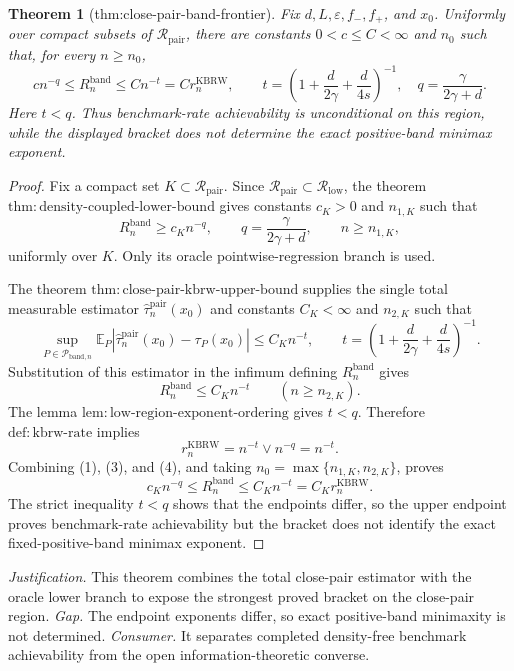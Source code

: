 \documentclass{article}
\newtheorem{theorem}{Theorem}
\begin{document}
\begin{theorem}[thm:close-pair-band-frontier]\label{thm:close-pair-band-frontier}
Fix \(d,L,\varepsilon,f_-,f_+\), and \(x_0\).  Uniformly over compact
subsets of \(\mathcal R_{\mathrm{pair}}\), there are constants
\(0<c\leq C<\infty\) and \(n_0\) such that, for every \(n\geq n_0\),
\[
c n^{-q}\leq R_n^{\mathrm{band}}
\leq C n^{-t}=C r_n^{\mathrm{KBRW}},
\qquad
t=\left(1+\frac d{2\gamma}+\frac d{4s}\right)^{-1},
\quad q=\frac\gamma{2\gamma+d}.
\]
Here \(t<q\).  Thus benchmark-rate achievability is unconditional on this
region, while the displayed bracket does not determine the exact positive-band
minimax exponent.
\end{theorem}
\begin{proof}
Fix a compact set \(K\subset\mathcal R_{\mathrm{pair}}\).  Since
\(\mathcal R_{\mathrm{pair}}\subset\mathcal R_{\mathrm{low}}\), the theorem
\(\mathrm{thm:density\mbox{-}coupled\mbox{-}lower\mbox{-}bound}\) gives
constants \(c_K>0\) and \(n_{1,K}\) such that
\[
R_n^{\mathrm{band}}\geq c_Kn^{-q},
\qquad
q=\frac{\gamma}{2\gamma+d},
\qquad n\geq n_{1,K},
\tag{1}
\]
uniformly over \(K\).  Only its oracle pointwise-regression branch is used.

The theorem
\(\mathrm{thm:close\mbox{-}pair\mbox{-}kbrw\mbox{-}upper\mbox{-}bound}\)
supplies the single total measurable estimator
\(\widehat\tau_n^{\mathrm{pair}}(x_0)\) and constants \(C_K<\infty\) and
\(n_{2,K}\) such that
\[
\sup_{P\in\mathcal P_{\mathrm{band},n}}
\mathbb E_P\left|
\widehat\tau_n^{\mathrm{pair}}(x_0)-\tau_P(x_0)
\right|
\leq C_Kn^{-t},
\qquad
t=\left(1+\frac d{2\gamma}+\frac d{4s}\right)^{-1}.
\tag{2}
\]
Substitution of this estimator in the infimum defining
\(R_n^{\mathrm{band}}\) gives
\[
R_n^{\mathrm{band}}\leq C_Kn^{-t}
\qquad(n\geq n_{2,K}).
\tag{3}
\]
The lemma
\(\mathrm{lem:low\mbox{-}region\mbox{-}exponent\mbox{-}ordering}\) gives
\(t<q\).  Therefore \(\mathrm{def:kbrw\mbox{-}rate}\) implies
\[
r_n^{\mathrm{KBRW}}=n^{-t}\vee n^{-q}=n^{-t}.
\tag{4}
\]
Combining (1), (3), and (4), and taking
\(n_0=\max\{n_{1,K},n_{2,K}\}\), proves
\[
c_Kn^{-q}\leq R_n^{\mathrm{band}}
\leq C_Kn^{-t}=C_Kr_n^{\mathrm{KBRW}}.
\]
The strict inequality \(t<q\) shows that the endpoints differ, so the upper
endpoint proves benchmark-rate achievability but the bracket does not identify
the exact fixed-positive-band minimax exponent.
\end{proof}
\par\smallskip\noindent \textit{Justification.} This theorem combines the total close-pair estimator with the oracle lower branch to expose the strongest proved bracket on the close-pair region. \textit{Gap.} The endpoint exponents differ, so exact positive-band minimaxity is not determined. \textit{Consumer.} It separates completed density-free benchmark achievability from the open information-theoretic converse.
\end{document}
